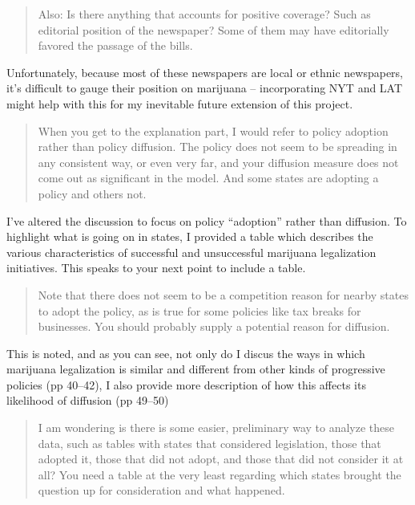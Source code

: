 \documentclass[12pt,stdletter,dateno,sigleft]{newlfm} %
\begin{document}
\begin{newlfm}
\begin{quotation}{\color{red}\noindent \footnotesize
Also: Is there anything that accounts for positive coverage?  Such as editorial position of the newspaper?  Some of them may have editorially favored the passage of the bills.
}
\end{quotation}

Unfortunately, because most of these newspapers are local or ethnic newspapers, it's difficult to gauge their position on marijuana -- incorporating NYT and LAT might help with this for my inevitable future extension of this project. 


\begin{quotation}{\color{red}\noindent \footnotesize
When you get to the explanation part, I would refer to policy adoption rather than policy diffusion.  The policy does not seem to be spreading in any consistent way, or even very far, and your diffusion measure does not come out as significant in the model.  And some states are adopting a policy and others not. 
}
\end{quotation}



I've altered the discussion to focus on policy ``adoption'' rather than diffusion. To highlight what is going on in states, I provided a table which describes the various characteristics of successful and unsuccessful marijuana legalization initiatives. This speaks to your next point to include a table. 


\begin{quotation}{\color{red}\noindent \footnotesize
Note that there does not seem to be a competition reason for nearby states to adopt the policy, as is true for some policies like tax breaks for businesses.  You should probably supply a potential reason for diffusion.
}
\end{quotation}

This is noted, and as you can see, not only do I discus the ways in which marijuana legalization is similar and different from other kinds of progressive policies (pp 40--42), I also provide more description of how this affects its likelihood of diffusion (pp 49--50)



\begin{quotation}{\color{red}\noindent \footnotesize
I am wondering is there is some easier, preliminary way to analyze these data, such as tables with states that considered legislation, those that adopted it, those that did not adopt, and those that did not consider it at all?   You need a table at the very least regarding which states brought the question up for consideration and what happened. \newline

}
\end{quotation}
\end{newlfm}
\end{document}
